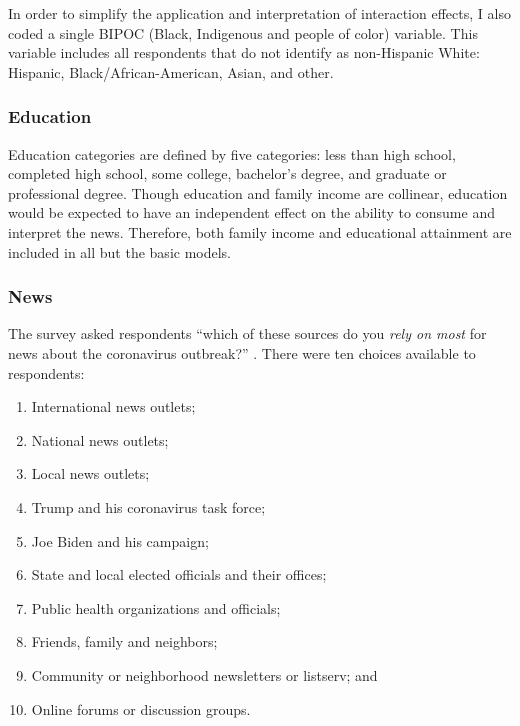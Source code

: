 \documentclass[11pt]{article}
\begin{document}
In order to simplify the application and interpretation of interaction effects, I also coded a single BIPOC (Black, Indigenous and people of color) variable. This variable includes all respondents that do not identify as non-Hispanic White: Hispanic, Black/African-American, Asian, and other.


\subsubsection{Education}\label{sec:education-vars}

Education categories are defined by five categories: less than high school, completed high school, some college, bachelor's degree, and graduate or professional degree. Though education and family income are collinear, education would be expected to have an independent effect on the ability to consume and interpret the news. Therefore, both family income and educational attainment are included in all but the basic models.

\subsubsection{News}

The survey asked respondents ``which of these sources do you \emph{rely on most} for news about the coronavirus outbreak?'' \citep{PewJune2020,Shearer2020}. There were ten choices available to respondents:

\begin{enumerate}
\def\labelenumi{(\arabic{enumi})}
    \item International news outlets;
    \item National news outlets;
    \item Local news outlets;
    \item Trump and his coronavirus task force;
    \item Joe Biden and his campaign;
    \item State and local elected officials and their offices;
    \item Public health organizations and officials;
    \item Friends, family and neighbors;
    \item Community or neighborhood newsletters or listserv; and
    \item Online forums or discussion groups.
\end{enumerate}
\end{document}
